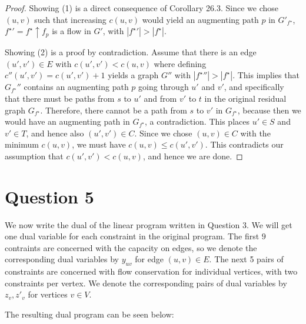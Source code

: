\documentclass[a4paper, 10pt, oneside, article]{memoir}
\begin{document}
\begin{proof}
  Showing (1) is a direct consequence of Corollary 26.3. Since we
  chose $(u,v)$ such that increasing $c(u,v)$ would yield an
  augmenting path $p$ in $G'_{f^\star}$, ${f^\star}' = f^\star
  \uparrow f_p$ is a flow in $G'$, with $|{f^\star}'| > |f^\star|$.

  Showing (2) is a proof by contradiction. Assume that there is an
  edge $(u', v') \in E$ with $c(u',v') < c(u,v)$ where defining
  $c''(u', v') = c(u',v')+1$ yields a graph $G''$ with $|{f^\star}''|
  > |f^\star|$. This implies that $G_{f^\star}''$ contains an
  augmenting path $p$ going through $u'$ and $v'$, and specifically
  that there must be paths from $s$ to $u'$ and from $v'$ to $t$ in
  the original residual graph $G_{f^\star}$. Therefore, there cannot
  be a path from $s$ to $v'$ in $G_{f^\star}$, because then we would
  have an augmenting path in $G_{f^\star}$, a contradiction. This
  places $u' \in S$ and $v' \in T$, and hence also $(u', v') \in
  C$. Since we chose $(u,v) \in C$ with the minimum $c(u,v)$, we must
  have $c(u,v) \leq c(u', v')$. This contradicts our assumption that
  $c(u', v') < c(u,v)$, and hence we are done.
\end{proof}

\section*{Question 5}

We now write the dual of the linear program written in Question 3. We
will get one dual variable for each constraint in the original
program. The first $9$ contraints are concerned with the capacity on
edges, so we denote the corresponding dual variables by $y_{uv}$ for
edge $(u,v)\in E$. The next 5 pairs of constraints are concerned with
flow conservation for individual vertices, with two constraints per
vertex. We denote the corresponding pairs of dual variables by $z_v,
z'_v$ for vertices $v \in V$.

The resulting dual program can be seen below:
\end{document}
